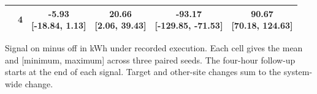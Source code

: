 \begin{table}[H]
\begin{tabular*}{\columnwidth}{@{\extracolsep{\fill}}lccccc@{}}
 & 4 & \shortstack{-5.93\\{}[-18.84, 1.13]} & \shortstack{20.66\\{}[2.06, 39.43]} & \shortstack{-93.17\\{}[-129.85, -71.53]} & \shortstack{90.67\\{}[70.18, 124.63]}\\
\bottomrule
\end{tabular*}
\vspace{3pt}
\parbox{\columnwidth}{Signal on minus off in kWh under recorded execution. Each cell gives the mean and [minimum, maximum] across three paired seeds. The four-hour follow-up starts at the end of each signal. Target and other-site changes sum to the system-wide change.}
\end{table}
